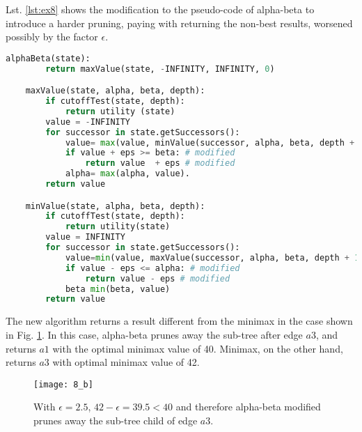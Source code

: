 Lst. \ref{lst:ex8} shows the modification to the pseudo-code of alpha-beta to introduce a harder pruning, paying with returning the non-best results, worsened possibly by the factor $\epsilon$.

\begin{lstlisting}[language=python, label={lst:ex8}, caption={Modified code: the changes are in lines 110-11 and 21-22.}]
    alphaBeta(state):
        return maxValue(state, -INFINITY, INFINITY, 0)

    maxValue(state, alpha, beta, depth):
        if cutoffTest(state, depth):
            return utility (state)
        value = -INFINITY
        for successor in state.getSuccessors():
            value= max(value, minValue(successor, alpha, beta, depth + 1))
            if value + eps >= beta: # modified
                return value  + eps # modified
            alpha= max(alpha, value).
        return value

    minValue(state, alpha, beta, depth):
        if cutoffTest(state, depth):
            return utility(state)
        value = INFINITY
        for successor in state.getSuccessors():
            value=min(value, maxValue(successor, alpha, beta, depth + 1)
            if value - eps <= alpha: # modified
                return value - eps # modified
            beta min(beta, value)
        return value
\end{lstlisting}

The new algorithm returns a result different from the minimax in the case shown in Fig. \ref{fig:8_b}. In this case, alpha-beta prunes away the sub-tree after edge $a3$, and returns $a1$ with the optimal minimax value of 40. Minimax, on the other hand, returns $a3$ with optimal minimax value of 42.
\begin{figure}[h]
    \centering
    \texttt{[image: 8\_b]}
    \caption{With $\epsilon = 2.5$, $42 -\epsilon = 39.5 < 40$ and therefore alpha-beta modified prunes away the sub-tree child of edge $a3$.}
    \label{fig:8_b}
\end{figure}
